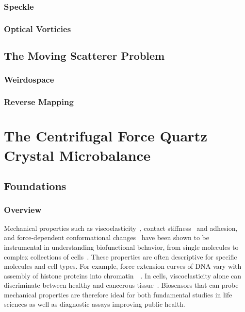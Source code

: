 \documentclass[a4paper,titlepage,onecolumn]{report}
\begin{document}
\section{Speckle}
\section{Optical Vorticies}

\chapter{The Moving Scatterer Problem}
\section{Weirdospace}
\section{Reverse Mapping}




\part{The Centrifugal Force Quartz Crystal Microbalance}
\label{part:qcm}
\chapter{Foundations}
\section{Overview}
Mechanical properties such as
viscoelasticity~\cite{steinem2007piezoelectric}, contact
stiffness~\cite{johannsman2007contacts} and adhesion, and force-dependent
conformational changes~\cite{fant2000adsorption} have been shown to be
instrumental in understanding biofunctional behavior, from single molecules
to complex collections of cells~\cite{li2008thickness}. These properties
are often descriptive for specific molecules and cell types. For example,
force extension curves of DNA vary with assembly of histone proteins into
chromatin~\cite{cui2000pulling}~\cite{larson2012trigger}. In cells,
viscoelasticity alone can discriminate between healthy and cancerous
tissue~\cite{rebelo2013comparison}.  Biosensors that can probe mechanical
properties are therefore ideal for both fundamental studies in life
sciences as well as diagnostic assays improving public health.
\end{document}
